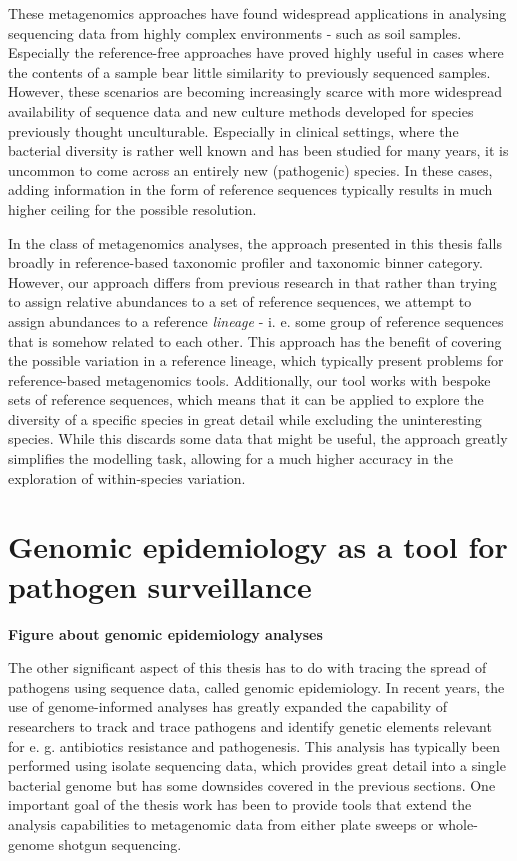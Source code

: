 \documentclass[officiallayout]{tktla}
\begin{document}
These metagenomics approaches have found widespread applications in
analysing sequencing data from highly complex environments - such as
soil samples. Especially the reference-free approaches have proved
highly useful in cases where the contents of a sample bear little
similarity to previously sequenced samples. However, these scenarios
are becoming increasingly scarce with more widespread availability of
sequence data and new culture methods developed for species previously
thought unculturable. Especially in clinical settings, where the
bacterial diversity is rather well known and has been studied for many
years, it is uncommon to come across an entirely new (pathogenic)
species. In these cases, adding information in the form of reference
sequences typically results in much higher ceiling for the possible
resolution.

In the class of metagenomics analyses, the approach presented in this
thesis falls broadly in reference-based taxonomic profiler and
taxonomic binner category. However, our approach differs from previous
research in that rather than trying to assign relative abundances to a
set of reference sequences, we attempt to assign abundances to a
reference \textit{lineage} - i. e. some group of reference sequences
that is somehow related to each other. This approach has the benefit
of covering the possible variation in a reference lineage, which
typically present problems for reference-based metagenomics
tools. Additionally, our tool works with bespoke sets of reference
sequences, which means that it can be applied to explore the diversity
of a specific species in great detail while excluding the
uninteresting species. While this discards some data that might be
useful, the approach greatly simplifies the modelling task, allowing
for a much higher accuracy in the exploration of within-species
variation.

\section{Genomic epidemiology as a tool for pathogen surveillance}

\textbf{Figure about genomic epidemiology analyses}

The other significant aspect of this thesis has to do with tracing the
spread of pathogens using sequence data, called genomic
epidemiology. In recent years, the use of genome-informed analyses has
greatly expanded the capability of researchers to track and trace
pathogens and identify genetic elements relevant for e. g. antibiotics
resistance and pathogenesis. This analysis has typically been
performed using isolate sequencing data, which provides great detail
into a single bacterial genome but has some downsides covered in the
previous sections. One important goal of the thesis work has been to
provide tools that extend the analysis capabilities to metagenomic
data from either plate sweeps or whole-genome shotgun sequencing.
\end{document}
